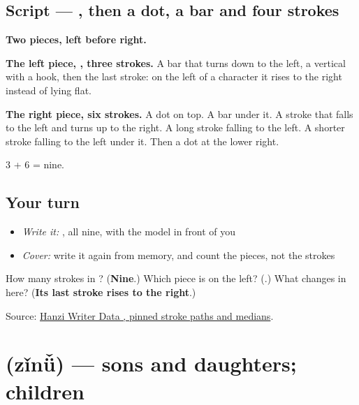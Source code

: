 \subsection*{Script — , then a dot, a bar and four strokes}

\begin{quote}
\end{quote}

\textbf{Two pieces, left before right.}

\textbf{The left piece, , three strokes.} A bar that turns down to the left, a vertical with a hook, then the last stroke: on the left of a character it rises to the right instead of lying flat.

\textbf{The right piece, six strokes.} A dot on top. A bar under it. A stroke that falls to the left and turns up to the right. A long stroke falling to the left. A shorter stroke falling to the left under it. Then a dot at the lower right.

3 + 6 = nine.

\subsection*{Your turn}
\begin{itemize}
\raggedright
  \item \emph{Write it:} , all nine, with the model in front of you
  \item \emph{Cover:} write it again from memory, and count the pieces, not the strokes
\end{itemize}

\begin{tcolorbox}[breakable,colback=teal!4,colframe=teal!35!black,title={Before you move on}]
How many strokes in ? (\textbf{Nine}.) Which piece is on the left? (\textbf{}.) What changes in  here? (\textbf{Its last stroke rises to the right}.)

Source: \href{https://raw.githubusercontent.com/chanind/hanzi-writer-data/68d10a4b21150cae5e1ebbd223eed289cf32d90c/data/\%E5\%AD\%A9.json}{Hanzi Writer Data , pinned stroke paths and medians}.
\end{tcolorbox}
\section[\texorpdfstring{\zh{子女} (zǐnǚ)}{子女 (zǐnǚ)}]{ (zǐnǚ) — sons and daughters; children}

